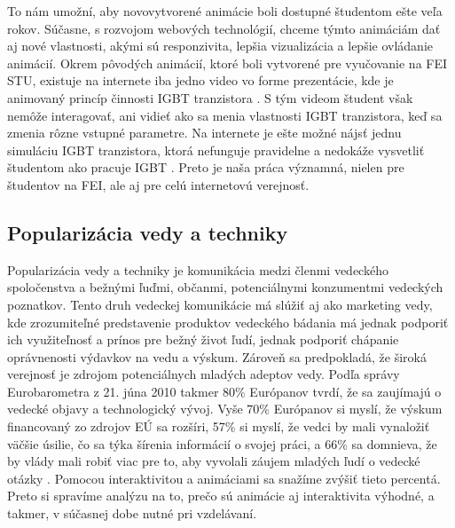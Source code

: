 To nám umožní, aby novovytvorené animácie boli dostupné študentom ešte veľa rokov. Súčasne, s rozvojom webových technológií, chceme týmto animáciám dať aj nové vlastnosti, akými sú responzivita, lepšia vizualizácia a lepšie ovládanie animácií.
\newline Okrem pôvodých animácií, ktoré boli vytvorené pre vyučovanie na \acrshort{FEI} \acrshort{STU}, existuje na internete iba jedno video  vo forme prezentácie, kde je animovaný princíp činnosti \acrshort{IGBT} tranzistora \cite{c29}. S tým videom študent však nemôže interagovať, ani vidieť ako sa menia vlastnosti \acrshort{IGBT} tranzistora, keď sa zmenia rôzne vstupné parametre. Na internete je ešte možné nájsť jednu simuláciu \acrshort{IGBT} tranzistora, ktorá nefunguje pravidelne a nedokáže vysvetliť študentom ako pracuje \acrshort{IGBT} \cite{c28}. Preto je naša práca významná, nielen pre študentov na \acrshort{FEI}, ale aj pre celú internetovú verejnosť.

\subsection{Popularizácia vedy a techniky}
Popularizácia vedy a techniky je komunikácia medzi členmi vedeckého spoločenstva a bežnými ľuďmi, občanmi, potenciálnymi konzumentmi vedeckých poznatkov. Tento druh vedeckej komunikácie má slúžiť aj ako marketing vedy, kde zrozumiteľné predstavenie produktov vedeckého bádania má jednak podporiť ich využiteľnosť a prínos pre bežný život ľudí, jednak podporiť chápanie oprávnenosti výdavkov na vedu a výskum. Zároveň sa predpokladá, že široká verejnosť je zdrojom potenciálnych mladých adeptov vedy.
\newline Podľa správy Eurobarometra z 21. júna 2010 takmer 80\% Európanov tvrdí, že sa zaujímajú o vedecké objavy a technologický vývoj. Vyše 70\% Európanov si myslí, že výskum financovaný zo zdrojov EÚ sa rozšíri, 57\% si myslí, že vedci by mali vynaložiť väčšie úsilie, čo sa týka šírenia informácií o svojej práci, a 66\% sa domnieva, že by vlády mali robiť viac pre to, aby vyvolali záujem mladých ľudí o vedecké otázky \cite{c14}. Pomocou interaktivitou a animáciami sa snažíme zvýšiť tieto percentá. Preto si spravíme analýzu na to, prečo sú animácie aj interaktivita výhodné, a takmer, v súčasnej dobe nutné pri vzdelávaní.

